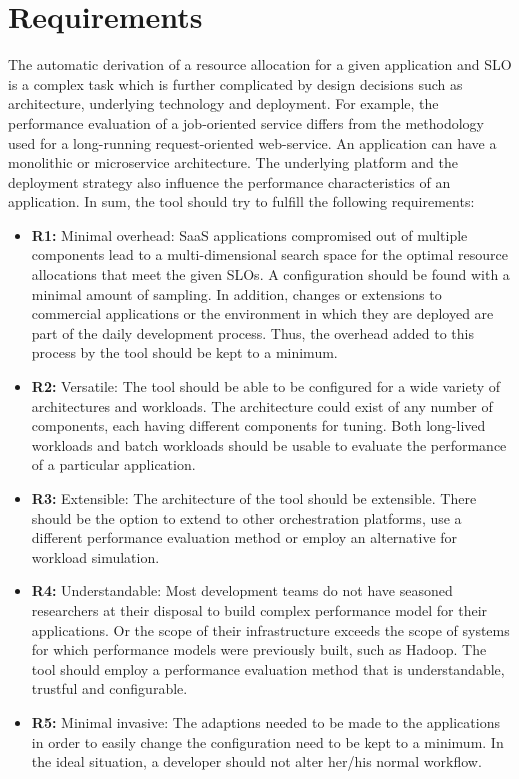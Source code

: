 \section{Requirements}
The automatic derivation of a resource allocation for a given application and SLO is a complex task which is further complicated by design  decisions such as architecture, underlying technology and deployment. For example, the performance evaluation of a job-oriented service differs from the methodology used for a long-running request-oriented web-service. An application can have a monolithic or microservice architecture. The underlying platform and the deployment strategy also influence the performance characteristics of an application. In sum, the tool should try to fulfill the following requirements:
\begin{itemize}
    \item \textbf{R1:}  Minimal overhead: SaaS applications compromised out of multiple components lead to a multi-dimensional search space for the optimal resource allocations that meet the given SLOs. A configuration should be found with a minimal amount of sampling. In addition, changes or extensions to  commercial applications or the environment in which they are deployed are part of the daily development process. Thus, the overhead added to this process by the tool should be kept to a minimum.
    \item \textbf{R2:}  Versatile: The tool should be able to be configured for a wide variety of architectures and workloads. The architecture could exist of any number of components, each having different components for tuning. Both long-lived workloads and batch workloads should be usable to evaluate the performance of a particular application. 
    \item \textbf{R3:}  Extensible: The architecture of the tool should be extensible. There should be the option to extend to other orchestration platforms, use a different performance evaluation method or employ an alternative for workload simulation.
    \item \textbf{R4:}  Understandable: Most development teams do not have seasoned researchers at their disposal to build complex performance model for their applications. Or the scope of their infrastructure exceeds the scope of systems for which performance models were previously built, such as Hadoop.   The tool should employ a performance  evaluation method that is understandable, trustful and configurable.
    \item \textbf{R5:}  Minimal invasive: The adaptions needed to be made to the applications in order to easily change the configuration need to be kept to a minimum. In the ideal situation, a developer should not alter her/his normal workflow.
    
\end{itemize}
\newpage


